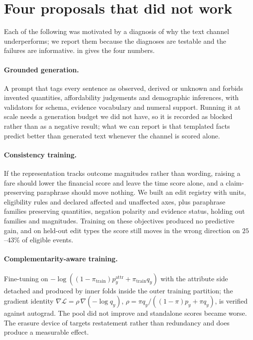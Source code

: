 \section{Four proposals that did not work}
\label{sec:negative}

Each of the following was motivated by a diagnosis of why the text channel underperforms; we
report them because the diagnoses are testable and the failures are informative.
 in  gives the four numbers.

\paragraph{Grounded generation.} A prompt that tags every sentence as observed, derived or
unknown and forbids invented quantities, affordability judgements and demographic inferences,
with validators for schema, evidence vocabulary and numeral support. Running it at scale needs a
generation budget we did not have, so it is recorded as blocked rather than as a negative
result; what we can report is that templated facts predict better than generated text whenever
the channel is scored alone.

\paragraph{Consistency training.} If the representation tracks outcome magnitudes rather than
wording, raising a fare should lower the financial score and leave the time score alone, and a
claim-preserving paraphrase should move nothing. We built an edit registry with units,
eligibility rules and declared affected and unaffected axes, plus paraphrase families preserving
quantities, negation polarity and evidence status, holding out families and magnitudes. Training
on these objectives produced no predictive gain, and on held-out edit types the score still
moves in the wrong direction on $25$--$43\%$ of eligible events.

\paragraph{Complementarity-aware training.} Fine-tuning on
$-\log((1-\pi_{\text{train}}) p^{\text{attr}}_{y} + \pi_{\text{train}} q_{y})$ with the
attribute side detached and produced by inner folds inside the outer training partition; the
gradient identity $\nabla \mathcal{L} = \rho\,\nabla(-\log q_y)$,
$\rho = \pi q_y / ((1-\pi)p_y + \pi q_y)$, is verified against autograd. The pool did not
improve and standalone scores became worse. The erasure device of 
targets restatement rather than redundancy and does produce a measurable effect.

